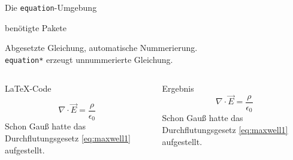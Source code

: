 \begin{frame}[fragile]{
  Die \texttt{equation}-Umgebung
  \hfill{}
}
  \begin{block}{benötigte Pakete}
    \begin{lstverbatim}
    \usepackage{amsmath}
    \usepackage{amssymb}
    \usepackage{mathtools}
    \end{lstverbatim}
  \end{block}
  Abgesetzte Gleichung, automatische Nummerierung. \\
  \texttt{equation*} erzeugt unnummerierte Gleichung.
  \begin{columns}[T]
    \begin{column}{0.6\textwidth}
      \begin{block}{\LaTeX-Code}
        \begin{lstverbatim}
        \begin{equation}
          \nabla \cdot \vec{E} =
          \frac{\rho} {\epsilon_0}
          \label{eq:maxwell1}
        \end{equation}
        Schon Gauß hatte das Durchflutungsgesetz \eqref{eq:maxwell1} aufgestellt.
        \end{lstverbatim}
      \end{block}
    \end{column}
    \begin{column}{0.35\textwidth}
      \begin{block}{Ergebnis}
        \begin{equation}
          \nabla \cdot \vec{E} =
          \frac{\rho}{\epsilon_0}
          \label{eq:maxwell1}
        \end{equation}
        \textrm{Schon Gauß hatte das Durchflutungsgesetz \eqref{eq:maxwell1} aufgestellt.}
      \end{block}
    \end{column}
  \end{columns}
\end{frame}

